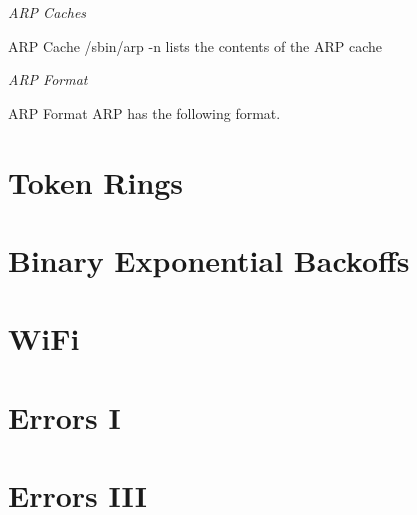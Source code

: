 \frmrule 

\textit{ARP Caches}


\begin{sidenote}{ARP Cache}
/sbin/arp -n lists the contents of the ARP cache\\
\end{sidenote}


\frmrule 

\textit{ARP Format}

\begin{sidenote}{ARP Format}
ARP has the following format.
\end{sidenote}





\section{Token Rings}


\section{Binary Exponential Backoffs}


\section{WiFi}



\section{Errors I}


\frmrule

\section{Errors III }

